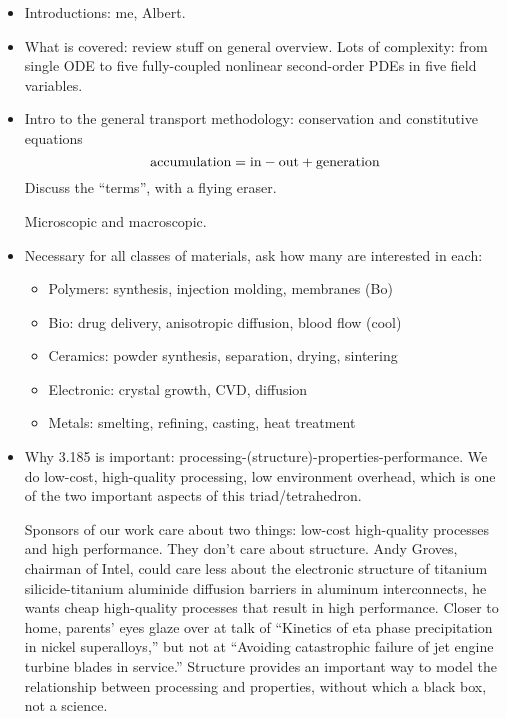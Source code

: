 \documentclass{report}
\begin{document}
\begin{itemize}
\item Introductions: me, Albert.

\item What is covered: review stuff on general overview.  Lots of complexity:
  from single ODE to five fully-coupled nonlinear second-order PDEs in five
  field variables.

\item Intro to the general transport methodology: conservation and
  constitutive equations
  \begin{equation}
    \label{eq:conservation}
    \rm accumulation = in - out + generation
  \end{equation}
  Discuss the ``terms'', with a flying eraser.

  Microscopic and macroscopic.

\item Necessary for all classes of materials, ask how many are interested in
  each:
  \begin{itemize}
  \item Polymers: synthesis, injection molding, membranes (Bo)
  \item Bio: drug delivery, anisotropic diffusion, blood flow (cool)
  \item Ceramics: powder synthesis, separation, drying, sintering
  \item Electronic: crystal growth, CVD, diffusion
  \item Metals: smelting, refining, casting, heat treatment
  \end{itemize}

\item Why 3.185 is important: processing-(structure)-properties-performance.
  We do low-cost, high-quality processing, low environment overhead, which is
  one of the two important aspects of this triad/tetrahedron.

  Sponsors of our work care about two things: low-cost high-quality processes
  and high performance.  They don't care about structure.  Andy Groves,
  chairman of Intel, could care less about the electronic structure of titanium
  silicide-titanium aluminide diffusion barriers in aluminum interconnects, he
  wants cheap high-quality processes that result in high performance.  Closer
  to home, parents' eyes glaze over at talk of ``Kinetics of eta phase
  precipitation in nickel superalloys,'' but not at ``Avoiding catastrophic
  failure of jet engine turbine blades in service.''  Structure provides an
  important way to model the relationship between processing and properties,
  without which a black box, not a science.
\end{itemize}
\end{document}
